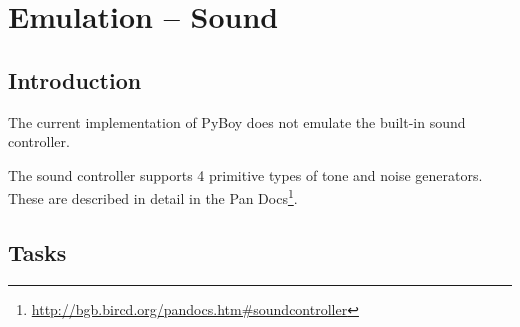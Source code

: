 \documentclass[11pt]{report} %
\author{Mads Ynddal}
\begin{document}
\onecolumn

\chapter*{Emulation -- Sound}
\section*{Introduction}
The current implementation of PyBoy does not emulate the built-in sound controller.

The sound controller supports 4 primitive types of tone and noise generators. These are described in detail in the Pan Docs\footnote{\url{http://bgb.bircd.org/pandocs.htm#soundcontroller}}.

\section*{Tasks}
\end{document}

